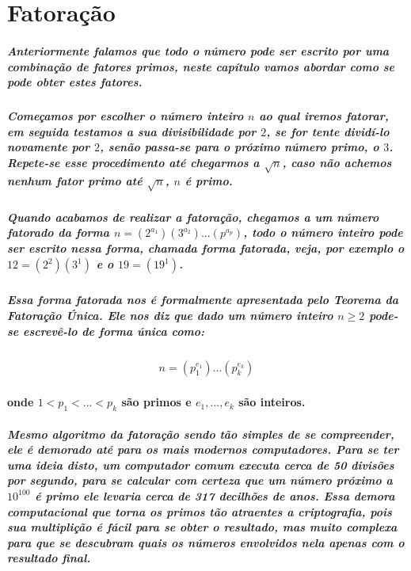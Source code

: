 \section{Fatora\c{c}\~{a}o}

\subparagraph{
Anteriormente falamos que todo o n\'umero pode ser escrito por uma combina\c{c}\~ao de fatores primos, neste cap\'itulo vamos abordar como se pode obter estes fatores.
}
\subparagraph{
Come\c{c}amos por escolher o n\'umero inteiro $n$ ao qual iremos fatorar, em seguida testamos a sua divisibilidade por $2$, se for tente divid\'i-lo novamente por $2$, sen\~ao passa-se para o pr\'oximo n\'umero primo, o $3$. Repete-se esse procedimento at\'e chegarmos a $\sqrt{n}$, caso n\~ao achemos nenhum fator primo at\'e $\sqrt{n}$, $n$ \'e primo.
}
\subparagraph{
Quando acabamos de realizar a fatora\c{c}\~ao, chegamos a um n\'umero fatorado da forma $n = (2^{a_{1}})(3^{a_{2}}) ... (p^{a_{p}})$, todo o n\'umero inteiro pode ser escrito nessa forma, chamada forma fatorada, veja, por exemplo o $12 = (2^2)(3^1)$ e o $19 = (19^1)$.
}
\subparagraph{
Essa forma fatorada nos \'e formalmente apresentada pelo \textit{Teorema da Fatora\c{c}\~ao \'Unica}. Ele nos diz que dado um n\'umero inteiro $n\geq2$ pode-se escrev\^e-lo de forma \'unica como:
}
\[	
	\begin{array}{c}
		\textit{$n = (p^{e_{1}}_{1}) ... (p^{e_{k}}_{k}) $}
	\end{array}
\]
\paragraph{
onde $1 < p_1 < ... < p_k $ s\~ao primos e $e_1, ..., e_k$ s\~ao inteiros.
}
\subparagraph{
Mesmo algoritmo da fatora\c{c}\~ao sendo t\~ao simples de se compreender, ele \'e demorado at\'e para os mais modernos computadores. Para se ter uma ideia disto, um computador comum executa cerca de {50} divis\~oes por segundo, para se calcular com certeza que um n\'umero pr\'oximo a $10^{100}$ \'e primo ele levaria cerca de {317} decilh\~oes de anos. Essa demora computacional que torna os primos t\~ao atraentes a criptografia, pois sua multipli\c{c}\~ao \'e f\'acil para se obter o resultado, mas muito complexa para que se descubram quais os n\'umeros envolvidos nela apenas com o resultado final.
}
